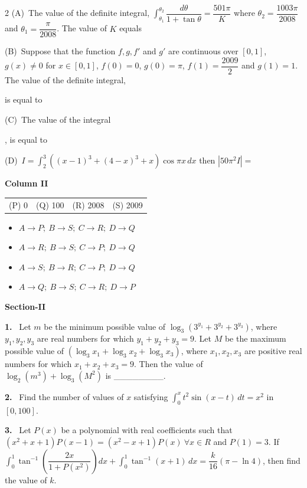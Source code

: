 \documentclass[10pt]{extarticle}
\newcommand{\sect}[1]{\par\smallskip\noindent\textbf{#1}\par}
\newcommand{\qn}[1]{\par\smallskip\noindent\textbf{#1.}~}
\newenvironment{qoptions}{\begin{itemize}[leftmargin=1.8em,itemsep=1pt,topsep=2pt,label={}]}{\end{itemize}}
\newcommand{\opt}[2]{\item[(#1)] #2}
\begin{document}
\begin{multicols}{2}
\noindent(A)\ The value of the definite integral, $\displaystyle\int_{\theta_1}^{\theta_2}\dfrac{d\theta}{1+\tan\theta}=\dfrac{501\pi}K$ where $\theta_2=\dfrac{1003\pi}{2008}$ and $\theta_1=\dfrac\pi{2008}$. The value of $K$ equals\par\smallskip
\noindent(B)\ Suppose that the function $f,g,f'$ and $g'$ are continuous over $[0,1]$, $g(x)\ne0$ for $x\in[0,1]$, $f(0)=0$, $g(0)=\pi$, $f(1)=\dfrac{2009}2$ and $g(1)=1$. The value of the definite integral, \par\smallskip\noindent{}\par\smallskip\noindent is equal to\par\smallskip
\noindent(C)\ The value of the integral \par\smallskip\noindent{}\par\smallskip\noindent, is equal to\par\smallskip
\noindent(D)\ $I=\displaystyle\int_2^3\left((x-1)^3+(4-x)^3+x\right)\cos\pi x\,dx$ then $\left|50\pi^2I\right|=$\par\smallskip
\noindent\textbf{Column II}\par
\begin{center}\small\begin{tabular}{cccc}(P) 0 & (Q) 100 & (R) 2008 & (S) 2009\end{tabular}\end{center}
\begin{qoptions}
\opt{A}{$A\to P;\ B\to S;\ C\to R;\ D\to Q$}
\opt{B}{$A\to R;\ B\to S;\ C\to P;\ D\to Q$}
\opt{C}{$A\to S;\ B\to R;\ C\to P;\ D\to Q$}
\opt{D}{$A\to Q;\ B\to S;\ C\to R;\ D\to P$}
\end{qoptions}
\sect{Section-II}
\qn{1} Let $m$ be the minimum possible value of $\log_3\left(3^{y_1}+3^{y_2}+3^{y_3}\right)$, where $y_1,y_2,y_3$ are real numbers for which $y_1+y_2+y_3=9$. Let $M$ be the maximum possible value of $(\log_3x_1+\log_3x_2+\log_3x_3)$, where $x_1,x_2,x_3$ are positive real numbers for which $x_1+x_2+x_3=9$. Then the value of $\log_2\left(m^3\right)+\log_3\left(M^2\right)$ is \_\_\_\_\_\_\_\_.
\qn{2} Find the number of values of $x$ satisfying $\displaystyle\int_0^xt^2\sin(x-t)\,dt=x^2$ in $[0,100]$.
\qn{3} Let $P(x)$ be a polynomial with real coefficients such that $\left(x^2+x+1\right)P(x-1)=\left(x^2-x+1\right)P(x)\ \forall x\in R$ and $P(1)=3$. If $\displaystyle\int_0^1\tan^{-1}\left(\dfrac{2x}{1+P\left(x^2\right)}\right)dx+\int_0^1\tan^{-1}(x+1)\,dx=\dfrac k{16}(\pi-\ln4)$, then find the value of $k$.

\end{multicols}
\end{document}
